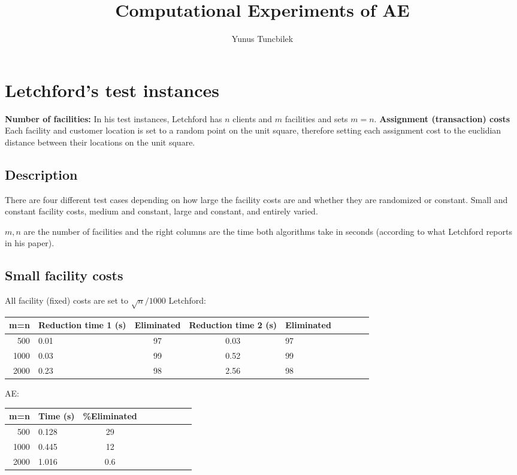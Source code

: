 \documentclass[11pt]{article}
\title{Computational Experiments of AE}
\author{Yunus Tuncbilek}
\begin{document}
\maketitle
   
\section{Letchford's test instances}
\textbf{Number of facilities:} In his test instances, Letchford has $n$ clients and $m$ facilities and sets $m=n$. \textbf{Assignment (transaction) costs} Each facility and customer location is set to a random point on the unit square, therefore setting each assignment cost to the euclidian distance between their locations on the unit square.
\subsection{Description}
There are four different test cases depending on how large the facility costs are and whether they are randomized or constant. Small and constant facility costs, medium and constant, large and constant, and entirely varied. 

$m,n$ are the number of facilities and the right columns  are the time both algorithms take in seconds (according to what Letchford reports in his paper).

\subsection*{Small facility costs}
All facility (fixed) costs are set to $\sqrt{n}/1000$ 
Letchford:
\begin{center}
\begin{tabular}{|rlc|clclcl}
  \hline
  m=n & Reduction time 1 (s) & Eliminated & Reduction time 2 (s) & Eliminated \\ \hline
  500 & 0.01 & 97 & 0.03 & 97\\ \hline
  1000 & 0.03 & 99 & 0.52 & 99\\ \hline
  2000  & 0.23 & 98& 2.56 &98 \\ \hline
\end{tabular}
\end{center}
AE:
\begin{center}
\begin{tabular}{|rlc|clclcl}
  \hline
  m=n & Time (s) & \%Eliminated \\ \hline
  500 & 0.128 & 29  \\ \hline
  1000 & 0.445 & 12 \\ \hline
  2000  & 1.016 & 0.6 \\ \hline
\end{tabular}
\end{center}
\end{document}
